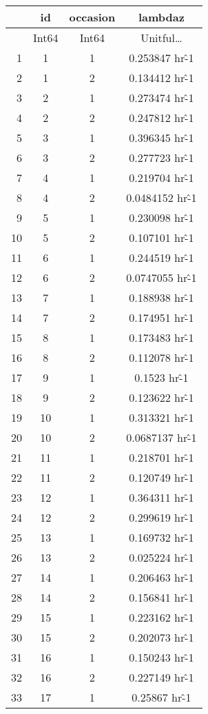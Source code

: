 \documentclass[12pt,a4paper]{article}
\begin{document}
\begin{tabular}{r|ccc}
	& id & occasion & lambdaz\\
	\hline
	& Int64 & Int64 & Unitful…\\
	\hline
	1 & 1 & 1 & 0.253847 hr\^-1 \\
	2 & 1 & 2 & 0.134412 hr\^-1 \\
	3 & 2 & 1 & 0.273474 hr\^-1 \\
	4 & 2 & 2 & 0.247812 hr\^-1 \\
	5 & 3 & 1 & 0.396345 hr\^-1 \\
	6 & 3 & 2 & 0.277723 hr\^-1 \\
	7 & 4 & 1 & 0.219704 hr\^-1 \\
	8 & 4 & 2 & 0.0484152 hr\^-1 \\
	9 & 5 & 1 & 0.230098 hr\^-1 \\
	10 & 5 & 2 & 0.107101 hr\^-1 \\
	11 & 6 & 1 & 0.244519 hr\^-1 \\
	12 & 6 & 2 & 0.0747055 hr\^-1 \\
	13 & 7 & 1 & 0.188938 hr\^-1 \\
	14 & 7 & 2 & 0.174951 hr\^-1 \\
	15 & 8 & 1 & 0.173483 hr\^-1 \\
	16 & 8 & 2 & 0.112078 hr\^-1 \\
	17 & 9 & 1 & 0.1523 hr\^-1 \\
	18 & 9 & 2 & 0.123622 hr\^-1 \\
	19 & 10 & 1 & 0.313321 hr\^-1 \\
	20 & 10 & 2 & 0.0687137 hr\^-1 \\
	21 & 11 & 1 & 0.218701 hr\^-1 \\
	22 & 11 & 2 & 0.120749 hr\^-1 \\
	23 & 12 & 1 & 0.364311 hr\^-1 \\
	24 & 12 & 2 & 0.299619 hr\^-1 \\
	25 & 13 & 1 & 0.169732 hr\^-1 \\
	26 & 13 & 2 & 0.025224 hr\^-1 \\
	27 & 14 & 1 & 0.206463 hr\^-1 \\
	28 & 14 & 2 & 0.156841 hr\^-1 \\
	29 & 15 & 1 & 0.223162 hr\^-1 \\
	30 & 15 & 2 & 0.202073 hr\^-1 \\
	31 & 16 & 1 & 0.150243 hr\^-1 \\
	32 & 16 & 2 & 0.227149 hr\^-1 \\
	33 & 17 & 1 & 0.25867 hr\^-1 \\

\end{tabular}
\end{document}
